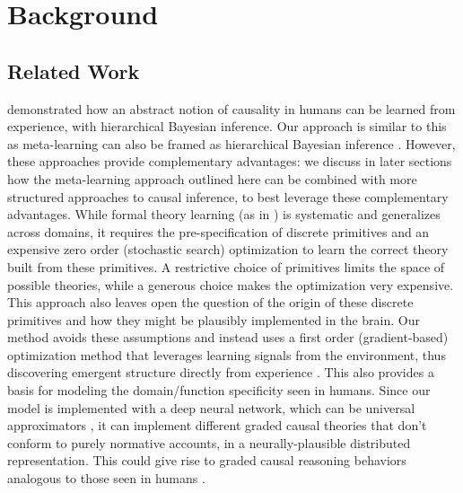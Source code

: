 \section{Background}

\subsection{Related Work}

\citet{goodman2011learning} demonstrated how an abstract notion of causality in humans can be learned from experience, with hierarchical Bayesian inference. Our approach is similar to this as meta-learning can also be framed as hierarchical Bayesian inference \citep{grant2018recasting}. However, these approaches provide complementary advantages: we discuss in later sections how the meta-learning approach outlined here can be combined with more structured approaches to causal inference, to best leverage these complementary advantages. While formal theory learning (as in \citet{goodman2011learning}) is systematic and generalizes across domains, it requires the pre-specification of discrete primitives and an expensive zero order (stochastic search) optimization to learn the correct theory built from these primitives. \citep{schulz2012finding, bramley2018grounding} A restrictive choice of primitives limits the space of possible theories, while a generous choice makes the optimization very expensive. This approach also leaves open the question of the origin of these discrete primitives and how they might be plausibly implemented in the brain. Our method avoids these assumptions and instead uses a first order (gradient-based) optimization method that leverages learning signals from the environment, thus discovering emergent structure directly from experience \citep{mcclelland2010letting}. This also provides a basis for modeling the domain/function specificity \citep{krynski2007role, lombrozo2010causal} seen in humans. Since our model is implemented with a deep neural network, which can be universal approximators \citep{siegelmann1995computational, hornik1991approximation}, it can implement different graded causal theories that don't conform to purely normative accounts, in a neurally-plausible distributed representation.  This could give rise to graded causal reasoning behaviors analogous to those seen in humans \citep{rehder2014independence, rehder2017failures, fernbach2010neglect, fernbach2013cognitive}. 


